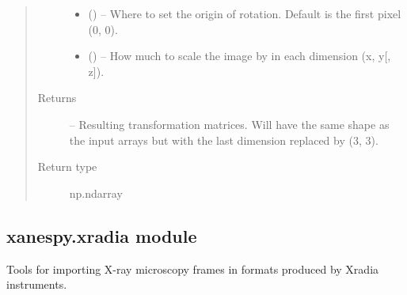\documentclass[letterpaper,10pt,english]{sphinxmanual}
\begin{document}
\begin{fulllineitems}
\begin{quote}
\begin{description}
\begin{itemize}
\item {} 
 (\sphinxstyleliteralemphasis{, }) -- Where to set the origin of rotation. Default is the
first pixel (0, 0).

\item {} 
 (\sphinxstyleliteralemphasis{, }) -- How much to scale the image by in each dimension
(x, y{[}, z{]}).

\end{itemize}

\item[{Returns}] \leavevmode
{} -- Resulting transformation matrices. Will have the same shape as the
input arrays but with the last dimension replaced by (3, 3).

\item[{Return type}] \leavevmode
np.ndarray

\end{description}\end{quote}

\end{fulllineitems}



\subsection{xanespy.xradia module}
\label{\detokenize{xanespy:xanespy-xradia-module}}\label{\detokenize{xanespy:module-xanespy.xradia}}
Tools for importing X-ray microscopy frames in formats produced by
Xradia instruments.
\end{document}

